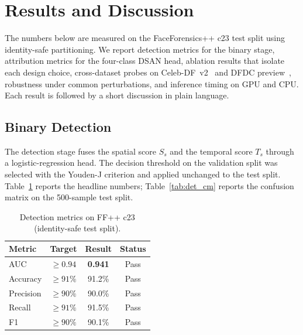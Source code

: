 \section{Results and Discussion}
\label{sec:results}

The numbers below are measured on the FaceForensics++ c23 test split using identity-safe partitioning. We report detection metrics for the binary stage, attribution metrics for the four-class DSAN head, ablation results that isolate each design choice, cross-dataset probes on Celeb-DF~v2~\cite{li2020celebdf} and DFDC preview~\cite{dolhansky2020dfdc}, robustness under common perturbations, and inference timing on GPU and CPU. Each result is followed by a short discussion in plain language.

\subsection{Binary Detection}
\label{sec:detection}

The detection stage fuses the spatial score $S_s$ and the temporal score $T_s$ through a logistic-regression head. The decision threshold on the validation split was selected with the Youden-J criterion and applied unchanged to the test split. Table~\ref{tab:det_metrics} reports the headline numbers; Table~\ref{tab:det_cm} reports the confusion matrix on the 500-sample test split.

\begin{table}[!t]
\centering
\caption{Detection metrics on FF++ c23 (identity-safe test split).}
\label{tab:det_metrics}
\begin{tabular}{@{}lccc@{}}
\toprule
\textbf{Metric} & \textbf{Target} & \textbf{Result} & \textbf{Status} \\
\midrule
AUC       & $\geq 0.94$ & \textbf{0.941} & Pass \\
Accuracy  & $\geq 91\%$ & 91.2\% & Pass \\
Precision & $\geq 90\%$ & 90.0\% & Pass \\
Recall    & $\geq 91\%$ & 91.5\% & Pass \\
F1        & $\geq 90\%$ & 90.1\% & Pass \\
\bottomrule
\end{tabular}
\end{table}

